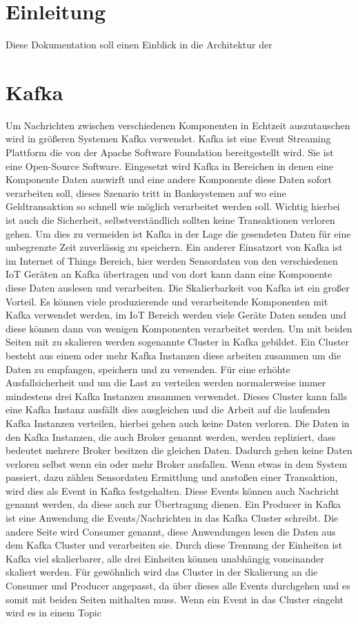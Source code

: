 
\chapter{Einleitung}
Diese Dokumentation soll einen Einblick in die Architektur der


\chapter{Kafka}
Um Nachrichten zwischen verschiedenen Komponenten in Echtzeit auszutauschen wird in größeren Systemen Kafka verwendet. Kafka ist eine Event Streaming Plattform die von der Apache Software Foundation bereitgestellt wird. Sie ist eine Open-Source Software. Eingesetzt wird Kafka in Bereichen in denen eine Komponente Daten auswirft und eine andere Komponente diese Daten sofort verarbeiten soll, dieses Szenario tritt in Banksystemen auf wo eine Geldtransaktion so schnell wie möglich verarbeitet werden soll. Wichtig hierbei ist auch die Sicherheit, selbstverständlich sollten keine Transaktionen verloren gehen. Um dies zu vermeiden ist Kafka in der Lage die gesendeten Daten für eine unbegrenzte Zeit zuverlässig zu speichern. Ein anderer Einsatzort von Kafka ist im Internet of Things Bereich, hier werden Sensordaten von den verschiedenen IoT Geräten an Kafka übertragen und von dort kann dann eine Komponente diese Daten auslesen und verarbeiten. Die Skalierbarkeit von Kafka ist ein großer Vorteil. Es können viele produzierende und verarbeitende Komponenten mit Kafka verwendet werden, im IoT Bereich werden viele Geräte Daten senden und diese können dann von wenigen Komponenten verarbeitet werden. Um mit beiden Seiten mit zu skalieren werden sogenannte Cluster in Kafka gebildet. Ein Cluster besteht aus einem oder mehr Kafka Instanzen diese arbeiten zusammen um die Daten zu empfangen, speichern und zu versenden. Für eine erhöhte Ausfallsicherheit und um die Last zu verteilen werden normalerweise immer mindestens drei Kafka Instanzen zusammen verwendet. Dieses Cluster kann falls eine Kafka Instanz ausfällt dies ausgleichen und die Arbeit auf die laufenden Kafka Instanzen verteilen, hierbei gehen auch keine Daten verloren. Die Daten in den Kafka Instanzen, die auch Broker genannt werden, werden repliziert, dass bedeutet mehrere Broker besitzen die gleichen Daten. Dadurch gehen keine Daten verloren selbst wenn ein oder mehr Broker ausfallen. Wenn etwas in dem System passiert, dazu zählen Sensordaten Ermittlung und anstoßen einer Transaktion, wird dies als Event in Kafka festgehalten. Diese Events können auch Nachricht genannt werden, da diese auch zur Übertragung dienen. Ein Producer in Kafka ist eine Anwendung die Events/Nachrichten in das Kafka Cluster schreibt. Die andere Seite wird Consumer genannt, diese Anwendungen lesen die Daten aus dem Kafka Cluster und verarbeiten sie. Durch diese Trennung der Einheiten ist Kafka viel skalierbarer, alle drei Einheiten können unabhängig voneinander skaliert werden. Für gewöhnlich wird das Cluster in der Skalierung an die Consumer und Producer angepasst, da über dieses alle Events durchgehen und es somit mit beiden Seiten mithalten muss. Wenn ein Event in das Cluster eingeht wird es in einem Topic 